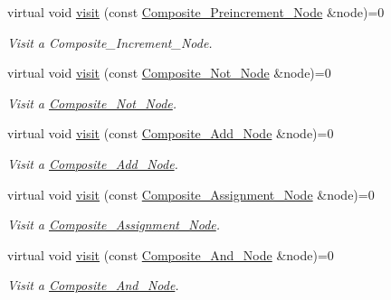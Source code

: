 \begin{DoxyCompactItemize}
virtual void \hyperlink{classMadara_1_1Expression__Tree_1_1Visitor_a88faa7afdbf0a288e9625dada5fd49f5}{visit} (const \hyperlink{classMadara_1_1Expression__Tree_1_1Composite__Preincrement__Node}{Composite\_\-Preincrement\_\-Node} \&node)=0
\begin{DoxyCompactList}\small\item\em Visit a Composite\_\-Increment\_\-Node. \item\end{DoxyCompactList}\item 
virtual void \hyperlink{classMadara_1_1Expression__Tree_1_1Visitor_aa5653bd83f66953364437226dcfa328f}{visit} (const \hyperlink{classMadara_1_1Expression__Tree_1_1Composite__Not__Node}{Composite\_\-Not\_\-Node} \&node)=0
\begin{DoxyCompactList}\small\item\em Visit a \hyperlink{classMadara_1_1Expression__Tree_1_1Composite__Not__Node}{Composite\_\-Not\_\-Node}. \item\end{DoxyCompactList}\item 
virtual void \hyperlink{classMadara_1_1Expression__Tree_1_1Visitor_ab82426f2ad2034d9f0f7dd71b0147528}{visit} (const \hyperlink{classMadara_1_1Expression__Tree_1_1Composite__Add__Node}{Composite\_\-Add\_\-Node} \&node)=0
\begin{DoxyCompactList}\small\item\em Visit a \hyperlink{classMadara_1_1Expression__Tree_1_1Composite__Add__Node}{Composite\_\-Add\_\-Node}. \item\end{DoxyCompactList}\item 
virtual void \hyperlink{classMadara_1_1Expression__Tree_1_1Visitor_aba9f7eb8d0b31c03f914d7e35e4df396}{visit} (const \hyperlink{classMadara_1_1Expression__Tree_1_1Composite__Assignment__Node}{Composite\_\-Assignment\_\-Node} \&node)=0
\begin{DoxyCompactList}\small\item\em Visit a \hyperlink{classMadara_1_1Expression__Tree_1_1Composite__Assignment__Node}{Composite\_\-Assignment\_\-Node}. \item\end{DoxyCompactList}\item 
virtual void \hyperlink{classMadara_1_1Expression__Tree_1_1Visitor_a4611293cddbf31811abdd2811e9bf746}{visit} (const \hyperlink{classMadara_1_1Expression__Tree_1_1Composite__And__Node}{Composite\_\-And\_\-Node} \&node)=0
\begin{DoxyCompactList}\small\item\em Visit a \hyperlink{classMadara_1_1Expression__Tree_1_1Composite__And__Node}{Composite\_\-And\_\-Node}. \item\end{DoxyCompactList}\item 

\end{DoxyCompactItemize}
